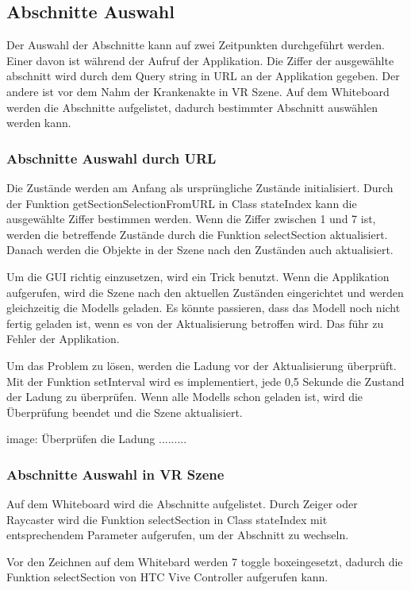  \subsection{Abschnitte Auswahl}

 Der Auswahl der Abschnitte kann auf zwei Zeitpunkten durchgeführt werden. Einer davon ist während der Aufruf der Applikation. Die Ziffer der ausgewählte abschnitt wird durch dem Query string in URL an der Applikation gegeben. Der andere ist vor dem Nahm der Krankenakte in VR Szene. Auf dem Whiteboard werden die Abschnitte aufgelistet, dadurch bestimmter Abschnitt auswählen werden kann.
 
  \subsubsection{Abschnitte Auswahl durch URL}
  Die Zustände werden am Anfang als ursprüngliche Zustände initialisiert. Durch der Funktion getSectionSelectionFromURL in Class stateIndex kann die ausgewählte Ziffer bestimmen werden. Wenn die Ziffer zwischen 1 und 7 ist, werden die betreffende Zustände durch die Funktion selectSection aktualisiert. Danach werden die Objekte in der Szene nach den Zuständen auch aktualisiert.
  
  Um die GUI richtig einzusetzen, wird ein Trick benutzt. Wenn die Applikation aufgerufen, wird die Szene nach den aktuellen Zuständen eingerichtet und werden gleichzeitig die Modells geladen. Es könnte passieren, dass das Modell noch nicht fertig geladen ist, wenn es von der Aktualisierung betroffen wird. Das führ zu Fehler der Applikation.
  
  Um das Problem zu lösen, werden die Ladung vor der Aktualisierung überprüft. Mit der Funktion setInterval wird es implementiert, jede 0,5 Sekunde die Zustand der Ladung zu überprüfen. Wenn alle Modells schon geladen ist, wird die Überprüfung beendet und die Szene aktualisiert.
  
  image: Überprüfen die Ladung .........
  
  \subsubsection{Abschnitte Auswahl in VR Szene}
  Auf dem Whiteboard wird die Abschnitte aufgelistet. Durch Zeiger oder Raycaster wird die Funktion selectSection in Class stateIndex mit entsprechendem Parameter aufgerufen, um der Abschnitt zu wechseln.
  
  Vor den Zeichnen auf dem Whitebard werden 7 \glqq toggle box\grqq eingesetzt, dadurch die Funktion selectSection von HTC Vive Controller aufgerufen kann.
  
